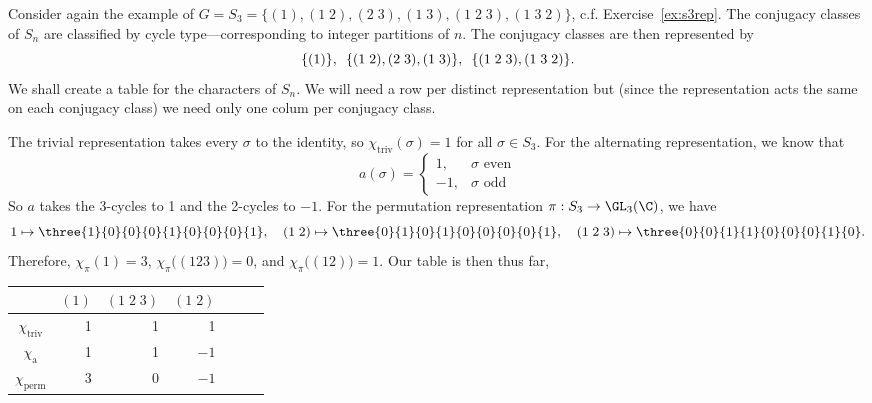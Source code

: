 \begin{ex}
Consider again the example of $G=S_3=\{(1),(1\;2),(2\;3),(1\;3),(1\;2\;3),(1\;3\;2)\}$, c.f. Exercise~\ref{ex:s3rep}. The conjugacy classes of $S_n$ are classified by cycle type---corresponding to integer partitions of $n$. The conjugacy classes are then represented by
	\[
	\{(1)\}, \enskip \{(1\;2),(2\;3),(1\;3)\}, \enskip \{(1\;2\;3),(1\;3\;2)\}.
	\]
We shall create a table for the characters of $S_n$. We will need a row per distinct representation but (since the representation acts the same on each conjugacy class) we need only one colum per conjugacy class. 

The trivial representation takes every $\sigma$ to the identity, so $\chi_{\text{triv}}(\sigma)=1$ for all $\sigma \in S_3$. For the alternating representation, we know that 
	\[
	a(\sigma)= 
	\begin{cases}
	1, & \sigma \text{ even} \\
	-1, & \sigma \text{ odd}
	\end{cases}
	\]
So $a$ takes the 3-cycles to 1 and the 2-cycles to $-1$. For the permutation representation $\pi: S_3 \to \GL_3(\C)$, we have
	\[
	1 \mapsto \three{1}{0}{0}{0}{1}{0}{0}{0}{1}, \quad (1\;2) \mapsto \three{0}{1}{0}{1}{0}{0}{0}{0}{1}, \quad (1\;2\;3) \mapsto \three{0}{0}{1}{1}{0}{0}{0}{1}{0}.
	\]
Therefore, $\chi_\pi(1)=3$, $\chi_\pi\big((123)\big)=0$, and $\chi_\pi\big((12)\big)=1$. Our table is then thus far,
	\begin{table}[h!]
	\centering
	\begin{tabular}{c|rrrrrr}
	& $(1)$ & $(1\;2\;3)$ & $(1\;2)$ \\ \hline 
	$\chi_{\text{triv}}$ & 1 & 1 & 1 \\
	$\chi_{\text{a}}$ & 1 & 1 & $-1$ \\
	$\chi_{\text{perm}}$ & 3 & 0 & $-1$ \\
	\end{tabular}
	\end{table}


\end{ex}

